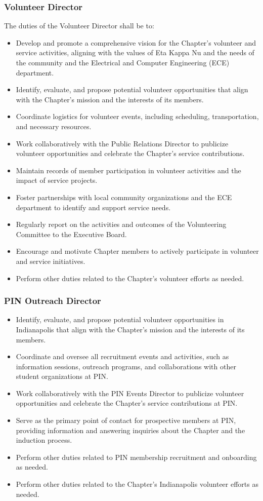 \documentclass[10pt, oneside]{article}
\begin{document}
\subsubsection{Volunteer Director}
The duties of the Volunteer Director shall be to:
\begin{itemize}
    \item Develop and promote a comprehensive vision for the Chapter's volunteer and service activities, aligning with the values of Eta Kappa Nu and the needs of the community and the Electrical and Computer Engineering (ECE) department.
    \item Identify, evaluate, and propose potential volunteer opportunities that align with the Chapter's mission and the interests of its members.
    \item Coordinate logistics for volunteer events, including scheduling, transportation, and necessary resources.
    \item Work collaboratively with the Public Relations Director to publicize volunteer opportunities and celebrate the Chapter's service contributions.
    \item Maintain records of member participation in volunteer activities and the impact of service projects.
    \item Foster partnerships with local community organizations and the ECE department to identify and support service needs.
    \item Regularly report on the activities and outcomes of the Volunteering Committee to the Executive Board.
    \item Encourage and motivate Chapter members to actively participate in volunteer and service initiatives.
    \item Perform other duties related to the Chapter's volunteer efforts as needed.
\end{itemize}
\subsubsection{PIN Outreach Director}
\begin{itemize}
	\item Identify, evaluate, and propose potential volunteer opportunities in Indianapolis that align with the Chapter's mission and the interests of its members.
	\item Coordinate and oversee all recruitment events and activities, such as information sessions, outreach programs, and collaborations with other student organizations at PIN.
	\item Work collaboratively with the PIN Events Director to publicize volunteer opportunities and celebrate the Chapter's service contributions at PIN.
	\item Serve as the primary point of contact for prospective members at PIN, providing information and answering inquiries about the Chapter and the induction process.
    \item Perform other duties related to PIN membership recruitment and onboarding as needed.
	\item Perform other duties related to the Chapter's Indianapolis volunteer efforts as needed.
\end{itemize}
\end{document}
